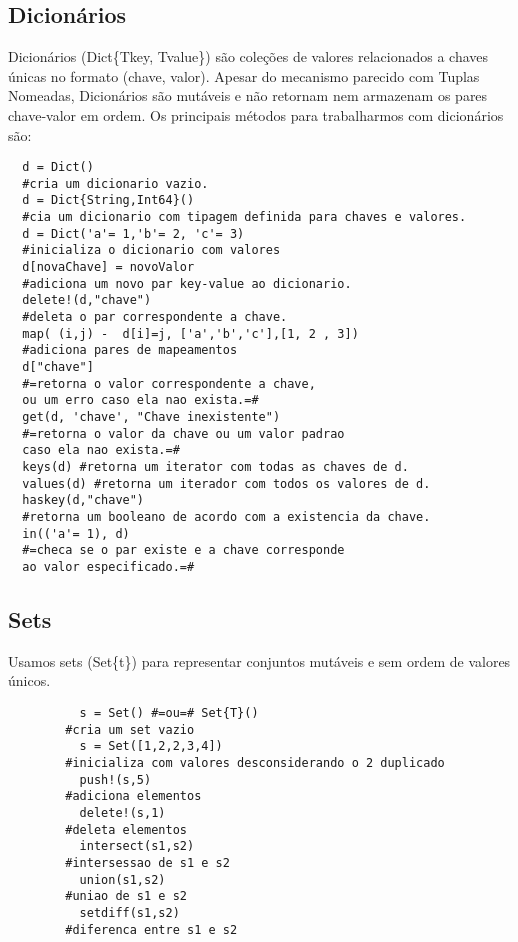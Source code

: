 \subsection{Dicionários}
Dicionários (Dict\{Tkey, Tvalue\}) são coleções de valores relacionados a chaves únicas no formato (chave, valor). Apesar do mecanismo parecido com Tuplas Nomeadas, Dicionários são mutáveis e não retornam nem armazenam os pares chave-valor em ordem. 
Os principais métodos para trabalharmos com dicionários são:
\begin{lstlisting}
  d = Dict() 
  #cria um dicionario vazio.
  d = Dict{String,Int64}() 
  #cia um dicionario com tipagem definida para chaves e valores.
  d = Dict('a'= 1,'b'= 2, 'c'= 3) 
  #inicializa o dicionario com valores
  d[novaChave] = novoValor 
  #adiciona um novo par key-value ao dicionario.
  delete!(d,"chave") 
  #deleta o par correspondente a chave.
  map( (i,j) -  d[i]=j, ['a','b','c'],[1, 2 , 3]) 
  #adiciona pares de mapeamentos
  d["chave"] 
  #=retorna o valor correspondente a chave, 
  ou um erro caso ela nao exista.=#
  get(d, 'chave', "Chave inexistente") 
  #=retorna o valor da chave ou um valor padrao 
  caso ela nao exista.=# 
  keys(d) #retorna um iterator com todas as chaves de d.
  values(d) #retorna um iterador com todos os valores de d.
  haskey(d,"chave") 
  #retorna um booleano de acordo com a existencia da chave.
  in(('a'= 1), d) 
  #=checa se o par existe e a chave corresponde 
  ao valor especificado.=#

\end{lstlisting}

\subsection{Sets}
Usamos sets (Set\{t\}) para representar conjuntos mutáveis e sem ordem de valores únicos.
    \begin{lstlisting}
          s = Set() #=ou=# Set{T}() 
        #cria um set vazio
          s = Set([1,2,2,3,4]) 
        #inicializa com valores desconsiderando o 2 duplicado
          push!(s,5) 
        #adiciona elementos
          delete!(s,1)
        #deleta elementos
          intersect(s1,s2) 
        #intersessao de s1 e s2
          union(s1,s2) 
        #uniao de s1 e s2
          setdiff(s1,s2) 
        #diferenca entre s1 e s2
    \end{lstlisting}

